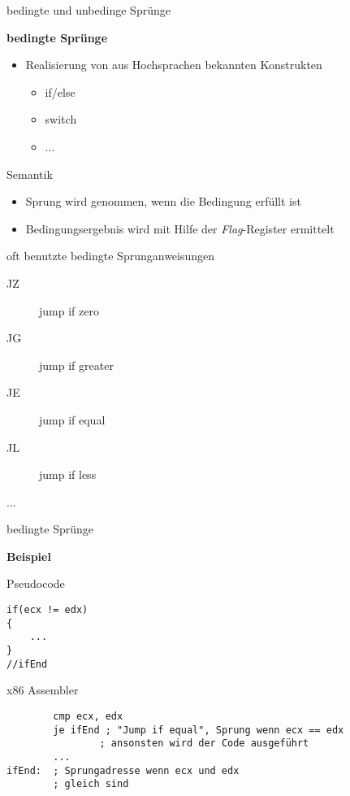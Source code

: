 \begin{frame}[fragile]{bedingte und unbedinge Sprünge}

\begin{center}
\textbf{bedingte Sprünge}
\end{center}

\begin{itemize}
	\item Realisierung von aus Hochsprachen bekannten Konstrukten
	\begin{itemize}
		\item if/else
		\item switch
		\item ...
	\end{itemize}
\end{itemize}

\makebox{}

Semantik
\begin{itemize}
	\item Sprung wird genommen, wenn die Bedingung erfüllt ist
	\item Bedingungsergebnis wird mit Hilfe der \textit{Flag}-Register ermittelt
\end{itemize}
\end{frame}


\begin{frame}
oft benutzte bedingte Sprunganweisungen
\begin{description}
	\item [JZ] jump if zero
	\item [JG] jump if greater 
	\item [JE] jump if equal 
	\item [JL] jump if less 
	\item [...]
\end{description}
\end{frame}


\begin{frame}[fragile]{bedingte Sprünge}

\begin{center}
\textbf{Beispiel}
\end{center}

Pseudocode
\begin{lstlisting}
if(ecx != edx)
{
	...
}
//ifEnd
\end{lstlisting}

x86 Assembler
\begin{lstlisting}
        cmp ecx, edx
        je ifEnd ; "Jump if equal", Sprung wenn ecx == edx
				; ansonsten wird der Code ausgeführt
        ...
ifEnd:  ; Sprungadresse wenn ecx und edx
        ; gleich sind 
\end{lstlisting}
\end{frame}


